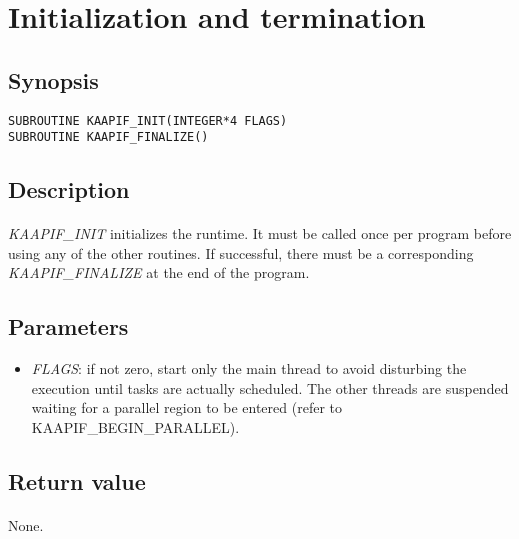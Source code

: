 \documentclass[a4paper, 11pt]{article}
\begin{document}
\makeRT %

\tableofcontents
{}

\newpage
\section{Initialization and termination}

\subsection{Synopsis}
\begin{small}
\lstset{language=C}
\begin{lstlisting}[frame=tb]
SUBROUTINE KAAPIF_INIT(INTEGER*4 FLAGS)
SUBROUTINE KAAPIF_FINALIZE()
\end{lstlisting}
\end{small}

\subsection{Description}
\paragraph{}
\textit{KAAPIF\_INIT} initializes the runtime. It must be called once per program
before using any of the other routines. If successful, there must be a
corresponding \textit{KAAPIF\_FINALIZE} at the end of the program.

\subsection{Parameters}
\begin{itemize}
\item \textit{FLAGS}: if not zero, start only the main thread to avoid disturbing
the execution until tasks are actually scheduled. The other threads are suspended
waiting for a parallel region to be entered (refer to KAAPIF\_BEGIN\_PARALLEL).
\end{itemize}

\subsection{Return value}
\paragraph{}
None.
\end{document}
